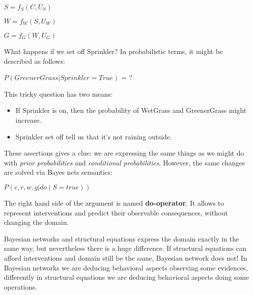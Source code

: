 \begin{example}
    $S = f_S(C, U_S)$

    $W = f_W(S, U_W)$

    $G = f_G(W, U_G)$ \vspace{3.5pt}

    What happens if we set off Sprinkler? In probabilistic terms, it might be described as follows:
    \begin{center}
        $P(GreenerGrass|Sprinkler=True)$ = ?
    \end{center} \vspace{3.5pt}

    This tricky question has two means: 
    \begin{itemize}
        \renewcommand{\labelitemi}{-}
        \item If Sprinkler is on, then the probability of WetGrass and GreenerGrass might increase.
        \item Sprinkler set off tell us that it's not raining outside. 
    \end{itemize} \vspace{3.5pt}

    These assertions gives a clue: we are expressing the same things as we might do with \textit{prior probabilities} and \textit{conditional probabilities}. However,
    the same changes are solved via Bayes nets semantics:
    \begin{center}
        $P(c, r, w, g|do(S = true))$
    \end{center} \vspace{3.5pt}

    The right hand side of the argument is named \textbf{do-operator}. It allows to represent interventions and predict their observable consequences, without changing the domain.
\end{example}
Bayesian networks and structural equations express the domain exactly in the same way, but nevertheless there is a huge difference. If structural equations can afford interventions 
and domain still be the same, Bayesian network does not! In Bayesian networks we are deducing behavioral aspects observing some evidences, differently in structural equations 
we are deducing behavioral aspects doing some operations.